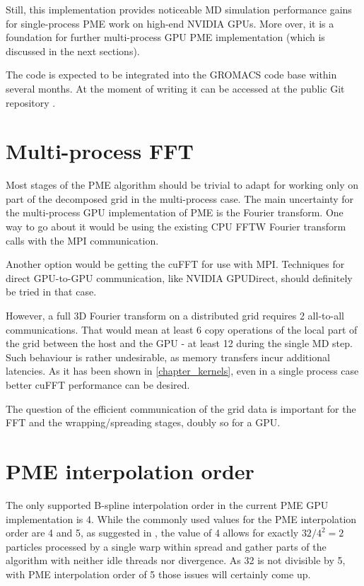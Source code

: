 \documentclass[12pt,a4paper]{report}
\begin{document}
Still, this implementation provides noticeable MD simulation performance gains for single-process PME work on high-end NVIDIA GPUs.
More over, it is a foundation for further multi-process GPU PME implementation (which is discussed in the next sections).

The code is expected to be integrated into the GROMACS code base within several months. At the moment of writing it can be accessed at the public Git repository \cite{pmegpugit}.

\section{Multi-process FFT}

Most stages of the PME algorithm should be trivial to adapt for working only on part of the decomposed grid in the multi-process case.
The main uncertainty for the multi-process GPU implementation of PME is the Fourier transform. One way to go about it would be using the existing CPU FFTW Fourier transform calls with the MPI communication.

Another option would be getting the cuFFT for use with MPI. Techniques for direct GPU-to-GPU communication, like NVIDIA GPUDirect, should definitely be tried in that case.

However, a full 3D Fourier transform on a distributed grid requires 2 all-to-all communications. That would mean at least 6 copy operations of the local part of the grid between the host and the GPU - at least 12 during the single MD step. Such behaviour is rather undesirable, as memory transfers incur additional latencies.
As it has been shown in \ref{chapter_kernels}, even in a single process case better cuFFT performance can be desired.

The question of the efficient communication of the grid data is important for the FFT and the wrapping/spreading stages, doubly so for a GPU.
 
\section{PME interpolation order}
The only supported B-spline interpolation order in the current PME GPU implementation is 4. While the commonly used values for the PME interpolation order are 4 and 5, as suggested in \cite{spme}, the value of 4 allows for exactly $32/4^2 = 2$ particles processed by a single warp within spread and gather parts of the algorithm with neither idle threads nor divergence. As 32 is not divisible by 5, with PME interpolation order of 5 those issues will certainly come up.
\end{document}
